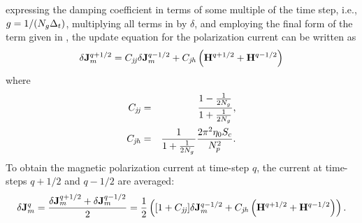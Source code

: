 expressing the damping coefficient in terms of some multiple of the
time step, i.e., $g=1/(N_g\Delta_t)$, multiplying all terms in
 by $\delta$, and employing the final form of the
term given in , the update equation for
the polarization current can be written as
\begin{equation}
  \delta\mathbf{J}_m^{q+1/2} = C_{\mathit{jj}}\delta\mathbf{J}_m^{q-1/2}
  +C_{\mathit{jh}}\left(\mathbf{H}^{q+1/2}+\mathbf{H}^{q-1/2}\right)
  \label{eq:jmUpdateDrudeI}
\end{equation}
where
\begin{eqnarray}
  C_{\mathit{jj}} &=& \frac{1-\frac{1}{2N_g}}{1+\frac{1}{2N_g}},  \\
  C_{\mathit{jh}} &=& \frac{1}{1+\frac{1}{2N_g}}\frac{2\pi^2 \eta_0 S_c}{N_p^2}.
\end{eqnarray}
To obtain the magnetic polarization current at time-step $q$, the
current at time-steps $q+1/2$ and $q-1/2$ are averaged:
\begin{equation}
  \delta\mathbf{J}_m^q =
  \frac{\delta\mathbf{J}_m^{q+1/2}+\delta\mathbf{J}_m^{q-1/2}}{2} = 
    \frac{1}{2}\left([1+C_{\mathit{jj}}]\delta\mathbf{J}_m^{q-1/2} +
    C_{\mathit{jh}}\left(\mathbf{H}^{q+1/2}+\mathbf{H}^{q-1/2}\right)\right).
  \label{eq:jmDrudeQ}
\end{equation}

